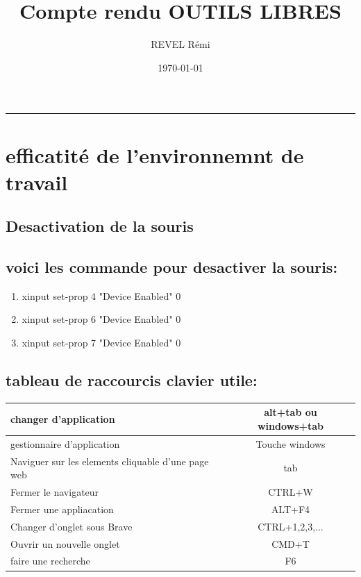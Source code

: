\documentclass{article}
\title{Compte rendu OUTILS LIBRES}
\author{REVEL Rémi}
\date{\today}
\begin{document}
\maketitle
\par\noindent\rule{\textwidth}{0.4pt}

\section{\huge{efficatité de l'environnemnt de travail}}
\subsection{\large{Desactivation de la souris}}

\subsection*{\normalsize{voici les commande pour desactiver la souris:} } 
\begin{enumerate}
    \item xinput set-prop 4 "Device Enabled" 0

    \item xinput set-prop 6 "Device Enabled" 0

    \item xinput set-prop 7 "Device Enabled" 0
\end{enumerate}

\subsection*{\normalsize{tableau de raccourcis clavier utile:} }    

\begin{center}
   \begin{tabular}{| l | c | }
     \hline
     changer d'application & alt+tab ou windows+tab\\ \hline
     gestionnaire d'application & Touche windows \\ \hline
     Naviguer sur les elements cliquable d'une page web & tab   \\ \hline
     Fermer le navigateur & CTRL+W \\ \hline
     Fermer une appliacation & ALT+F4 \\ \hline
     Changer d'onglet sous Brave & CTRL+1,2,3,...   \\ \hline
     Ouvrir un nouvelle onglet & CMD+T \\ \hline
     faire une recherche & F6 \\ \hline
   \end{tabular}
 \end{center}
 
\end{document}
